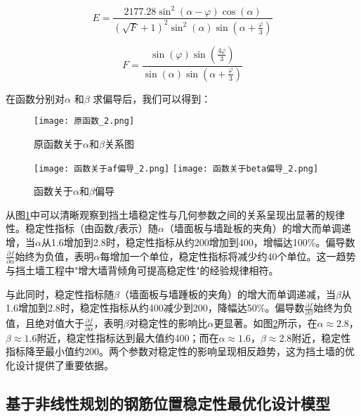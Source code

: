 \documentclass[withoutpreface,bwprint]{cumcmthesis}
\begin{document}
\begin{equation*}
    E = \frac{2177.28 \sin^2(\alpha-\varphi) \cos(\alpha)}{(\sqrt{F} + 1)^2 \sin^2(\alpha) \sin\left(\alpha+\frac{\varphi}{3}\right)}
\end{equation*}

\begin{equation*}
    F = \frac{\sin(\varphi) \sin\left(\frac{4\varphi}{3}\right)}{\sin(\alpha) \sin\left(\alpha+\frac{\varphi}{3}\right)}
\end{equation*}

在函数分别对$\alpha$ 和$\beta$ 求偏导后，我们可以得到：
    \begin{figure}[H]
        \centering
        \texttt{[image: 原函数\_2.png]}
        \caption{原函数关于$\alpha$和$\beta$关系图}
        \label{fig:原函数关于alpha和phi关系图}
    \end{figure}

    \begin{figure}[H]
        \centering
        {\texttt{[image: 函数关于af偏导\_2.png]}}
        {\texttt{[image: 函数关于beta偏导\_2.png]}}
        \caption{函数关于$\alpha$和$\beta$偏导}\label{fig:双图}
    \end{figure}

从图\ref{fig:原函数关于alpha和phi关系图}中可以清晰观察到挡土墙稳定性与几何参数之间的关系呈现出显著的规律性。稳定性指标（由函数$f$表示）随$\alpha$（墙面板与墙趾板的夹角）的增大而单调递增，当$\alpha$从1.6增加到2.8时，稳定性指标从约200增加到400，增幅达100\%。偏导数$\frac{\partial f}{\partial \alpha}$始终为负值，表明$\alpha$每增加一个单位，稳定性指标将减少约40个单位。这一趋势与挡土墙工程中"增大墙背倾角可提高稳定性"的经验规律相符。

与此同时，稳定性指标随$\beta$（墙面板与墙踵板的夹角）的增大而单调递减，当$\beta$从1.6增加到2.8时，稳定性指标从约400减少到200，降幅达50\%。偏导数$\frac{\partial f}{\partial \beta}$始终为负值，且绝对值大于$\frac{\partial f}{\partial \alpha}$，表明$\beta$对稳定性的影响比$\alpha$更显著。如图\ref{fig:双图}所示，在$\alpha \approx 2.8$，$\beta \approx 1.6$附近，稳定性指标达到最大值约400；而在$\alpha \approx 1.6$，$\beta \approx 2.8$附近，稳定性指标降至最小值约200。两个参数对稳定性的影响呈现相反趋势，这为挡土墙的优化设计提供了重要依据。
\subsection{基于非线性规划的钢筋位置稳定性最优化设计模型}
\end{document}

